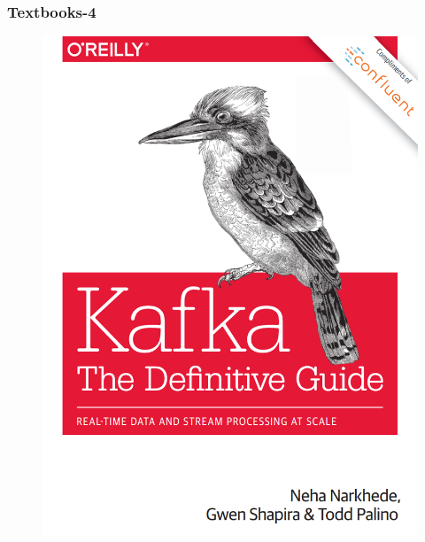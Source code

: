 \begin{frame}
	\frametitle{Textbooks-4}
	
	\begin{figure}[ht]
		\begin{minipage}[c][1\width]{
				0.3\textwidth}
			\centering
			\includegraphics[width=\linewidth]{./Figures/chapter-00/kafka-tdg.png}
		\end{minipage}
		\hfill	
		\begin{minipage}[c][1\width]{
				0.3\textwidth}
			\centering

\end{minipage}
\end{figure}
\end{frame}
